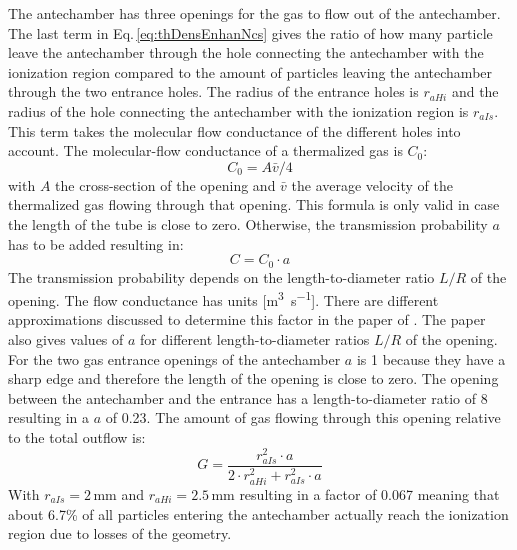 		The antechamber has three openings for the gas to flow out of the antechamber. The last term in Eq.\,\eqref{eq:thDensEnhanNcs} gives the ratio of how many particle leave the antechamber through the hole connecting the antechamber with the ionization region compared to the amount of particles leaving the antechamber through the two entrance holes. The radius of the entrance holes is $r_{aHi}$ and the radius of the hole connecting the antechamber with the ionization region is $r_{aIs}$. This term takes the molecular flow conductance of the different holes into account. The molecular-flow conductance of a thermalized gas is $C_0$:
		\begin{equation}
			C_0 = A\bar{v}/4
			\label{eq:theoMolFlowCondC0}
		\end{equation}
		with $A$ the cross-section of the opening and $\bar{v}$ the average velocity of the thermalized gas flowing through that opening. This formula is only valid in case the length of the tube is close to zero. Otherwise, the transmission probability $a$ has to be added resulting in:
		\begin{equation}
			C = C_0 \cdot a
			\label{eq:theoMolFlowCondCEff}
		\end{equation}
		The transmission probability depends on the length-to-diameter ratio $L/R$ of the opening. The flow conductance has units [\si{\cubic\meter\per\second}]. There are different approximations discussed to determine this factor in the paper of \cite{molFlowTubeTransm_Essen1976}. The paper also gives values of $a$ for different length-to-diameter ratios $L/R$ of the opening. For the two gas entrance openings of the antechamber $a$ is 1 because they have a sharp edge and therefore the length of the opening is close to zero. The opening between the antechamber and the entrance has a length-to-diameter ratio of 8 resulting in a $a$ of 0.23. The amount of gas flowing through this opening relative to the total outflow is:
		\begin{equation}
			G = \frac{r_{aIs}^2\cdot a}{2\cdot r_{aHi}^2 + r_{aIs}^2\cdot a}
		\end{equation}
		With $r_{aIs} = 2\,\si{\milli\meter}$ and $r_{aHi} = 2.5\,\si{\milli\meter}$ resulting in a factor of 0.067 meaning that about 6.7\% of all particles entering the antechamber actually reach the ionization region due to losses of the geometry.

		
